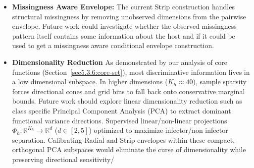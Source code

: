 \begin{itemize}
     \item \textbf{Missingness Aware Envelope:} The current Strip construction handles structural missingness by removing
            unobserved dimensions from the pairwise envelope. Future work could investigate whether the observed missingness pattern 
            itself contains some information about the host and if it could be used to get a missingness aware conditional envelope 
            construction.

      \item \textbf{Dimensionality Reduction} As demonstrated by our analysis of core functions (Section~\ref{sec5.3.6:core-set}), 
             most discriminative information lives in a low dimensional subspace. In higher dimensions ($K_h 
           \approx 40$), sample sparsity forces directional cones and grid bins to fall back onto conservative marginal 
           bounds. Future work should explore linear dimensionality reduction such as class specific Principal Component 
           Analysis (PCA) to extract dominant functional variance directions. Supervised linear/non-linear projections 
           $\Phi_h: \mathbb{R}^{K_h} \to \mathbb{R}^d$ ($d \in [2, 5]$) optimized to maximize infector/non infector 
           separation. Calibrating Radial and Strip envelopes within these compact, orthogonal PCA subspaces would 
           eliminate the curse of dimensionality while preserving directional sensitivity/


\end{itemize}
